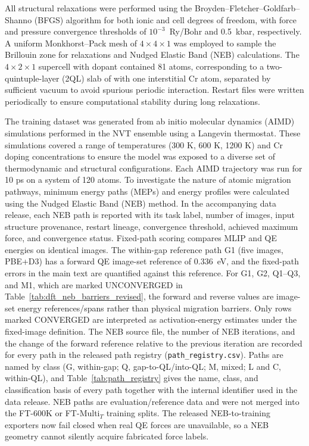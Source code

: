 \documentclass[pdflatex,sn-mathphys-num]{sn-jnl}%
\theoremstyle{thmstyleone}%
\theoremstyle{thmstyletwo}%
\theoremstyle{thmstylethree}%
\begin{document}
All structural relaxations were performed using the Broyden–Fletcher–Goldfarb–Shanno (BFGS) algorithm for both ionic and cell degrees of freedom, with force and pressure convergence thresholds of $10^{-3}$~Ry/Bohr and 0.5~kbar, respectively. A uniform Monkhorst–Pack mesh of $4 \times 4 \times 1$ was employed to sample the Brillouin zone for relaxations and Nudged Elastic Band (NEB) calculations. The $4 \times 2 \times 1$ supercell with dopant contained 81 atoms, corresponding to a two-quintuple-layer (2QL) slab of  with one interstitial Cr atom, separated by sufficient vacuum to avoid spurious periodic interaction. Restart files were written periodically to ensure computational stability during long relaxations.


The training dataset was generated from ab initio molecular dynamics (AIMD) simulations performed in the NVT ensemble using a Langevin thermostat. These simulations covered a range of temperatures (300 K, 600 K, 1200 K) and Cr doping concentrations to ensure the model was exposed to a diverse set of thermodynamic and structural configurations. Each AIMD trajectory was run for 10 ps on a system of 120 atoms. To investigate the nature of atomic migration pathways, minimum energy paths (MEPs) and energy profiles were calculated using the Nudged Elastic Band (NEB) method. In the accompanying data release, each NEB path is reported with its task label, number of images, input structure provenance, restart lineage, convergence threshold, achieved maximum force, and convergence status. Fixed-path scoring compares MLIP and QE energies on identical images. The within-gap reference path G1 (five images, PBE+D3) has a forward QE image-set reference of 0.336~eV, and the fixed-path errors in the main text are quantified against this reference. For G1, G2, Q1--Q3, and M1, which are marked UNCONVERGED in Table~\ref{tab:dft_neb_barriers_revised}, the forward and reverse values are image-set energy references/spans rather than physical migration barriers. Only rows marked CONVERGED are interpreted as activation-energy estimates under the fixed-image definition. The NEB source file, the number of NEB iterations, and the change of the forward reference relative to the previous iteration are recorded for every path in the released path registry (\texttt{path\_registry.csv}). Paths are named by class (G, within-gap; Q, gap-to-QL/into-QL; M, mixed; L and C, within-QL), and Table~\ref{tab:path_registry} gives the name, class, and classification basis of every path together with the internal identifier used in the data release.
NEB paths are evaluation/reference data and were not merged into the FT-600K or FT-Multi$_T$ training splits. The released NEB-to-training exporters now fail closed when real QE forces are unavailable, so a NEB geometry cannot silently acquire fabricated force labels.
\end{document}
